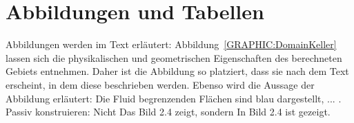 
\section{Abbildungen und Tabellen}
\label{SECTION:Abbildungen}

Abbildungen werden im Text erläutert: Abbildung~\ref{GRAPHIC:DomainKeller} lassen sich die physikalischen und geometrischen Eigenschaften des berechneten Gebiets entnehmen. Daher ist die Abbildung so platziert, dass sie nach dem Text erscheint, in dem diese beschrieben werden. Ebenso wird die Aussage der Abbildung erläutert: Die Fluid begrenzenden Flächen sind blau dargestellt, ... . Passiv konstruieren: Nicht \glqq Das Bild 2.4 zeigt\grqq, sondern \glqq In Bild 2.4 ist gezeigt\grqq. 

